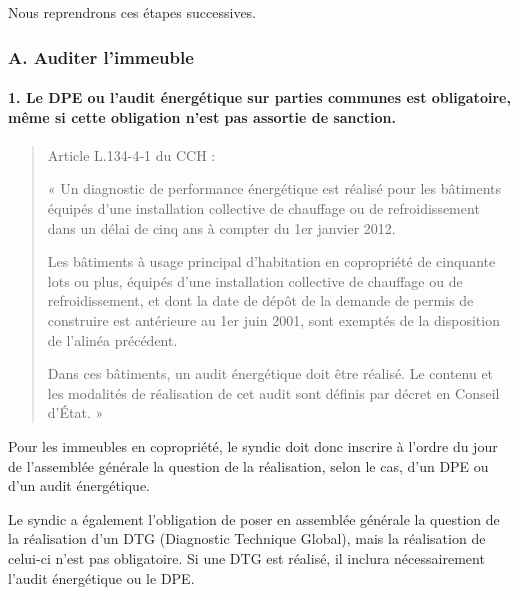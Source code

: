 	Nous reprendrons ces étapes successives.
	
	\subsubsection{A. Auditer l’immeuble}
	
		\paragraph{1. Le DPE ou l’audit énergétique sur parties communes est obligatoire, même si cette obligation n’est pas assortie de sanction.}
		
			\begin{quote}
				Article L.134-4-1 du CCH :
				
				« Un diagnostic de performance énergétique est réalisé pour les bâtiments équipés d'une installation collective de chauffage ou de refroidissement dans un délai de cinq ans à compter du 1er janvier 2012.
				
				Les bâtiments à usage principal d'habitation en copropriété de cinquante lots ou plus, équipés d'une installation collective de chauffage ou de refroidissement, et dont la date de dépôt de la demande de permis de construire est antérieure au 1er juin 2001, sont exemptés de la disposition de l'alinéa précédent.
				
				Dans ces bâtiments, un audit énergétique doit être réalisé. Le contenu et les modalités de réalisation de cet audit sont définis par décret en Conseil d'État. »
			\end{quote}
			
			Pour les immeubles en copropriété, le syndic doit donc inscrire à l’ordre du jour de l’assemblée générale la question de la réalisation, selon le cas, d’un DPE ou d’un audit énergétique.
			
			Le syndic a également l’obligation de poser en assemblée générale la question de la réalisation d’un DTG (Diagnostic Technique Global), mais la réalisation de celui-ci n’est pas obligatoire. Si une DTG est réalisé, il inclura nécessairement l’audit énergétique ou le DPE.
			
